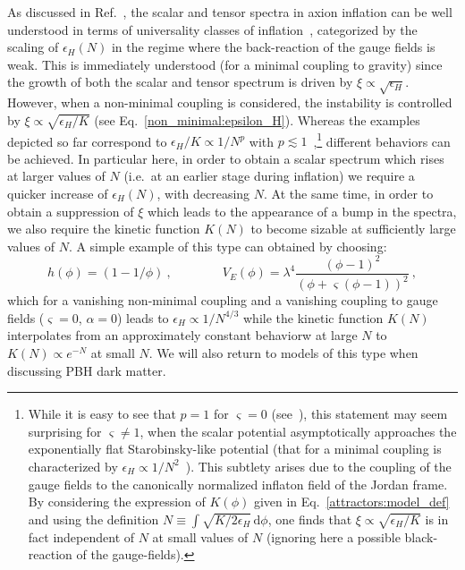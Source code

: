 As discussed in Ref.~\cite{Domcke:2016bkh}, the scalar and tensor spectra in axion inflation can be well understood in terms of universality classes of inflation~\cite{Mukhanov:2013tua,Roest:2013fha,Binetruy:2014zya}, categorized by the scaling of $\epsilon_H(N)$ in the regime where the back-reaction of the gauge fields is weak. This is immediately understood (for a minimal coupling to gravity) since the growth of both the scalar and tensor spectrum is driven by $\xi \propto \sqrt{\epsilon_H}$. However, when a non-minimal coupling is considered, the instability is controlled by $\xi \propto \sqrt{\epsilon_H/K}$ (see Eq.~\eqref{non_minimal:epsilon_H}). Whereas the examples depicted so far correspond to $\epsilon_H/K \propto 1/N^p$ with $p \lesssim 1$~\cite{Binetruy:2014zya},\footnote{While it is easy to see that $p = 1$ for $\varsigma = 0$ (see~\cite{Binetruy:2014zya}), this statement may seem surprising for $\varsigma \neq 1$, when the scalar potential asymptotically approaches the exponentially flat Starobinsky-like potential (that for a minimal coupling is characterized by $\epsilon_H \propto 1/N^2$~\cite{Binetruy:2014zya}). This subtlety arises due to the coupling of the gauge fields to the canonically normalized inflaton field of the Jordan frame. By considering the expression of $K(\phi)$ given in Eq.~\eqref{attractors:model_def} and using the definition $N \equiv \int \sqrt{K/2\epsilon_H} \, \textrm{d}\phi$, one finds that $\xi \propto \sqrt{\epsilon_H/K}$ is in fact independent of $N$ at small values of $N$ (ignoring here a possible black-reaction of the gauge-fields).} 
different behaviors can be achieved. In particular here, in order to obtain a scalar spectrum which rises at larger values of $N$ (i.e.\ at an earlier stage during inflation) we require a quicker increase of  $\epsilon_H(N)$, with decreasing $N$. At the same time, in order to obtain a suppression of $\xi$ which leads to the appearance of a bump in the spectra, we also require the kinetic function $K(N)$ to become sizable at sufficiently large values of $N$. A simple example of this type can obtained by choosing:
\begin{equation}
	\label{attractors:inv_definition}
 	h(\phi) = (1 - 1/\phi) \ , \qquad \qquad  V_E(\phi) = \lambda^4 \frac{ (\phi-1)^2}{ \left( \phi + \varsigma (\phi-1) \right)^2} \ ,
 \end{equation} 
 which for a vanishing non-minimal coupling and a vanishing coupling to gauge fields ($\varsigma = 0$, $\alpha = 0$) leads to $\epsilon_H \propto 1/N^{4/3}$ while the kinetic function $K(N)$ interpolates from an approximately constant behaviorw at large $N$ to $K(N) \propto e^{-N}$ at small $N$. We will also return to models of this type when discussing PBH dark matter.


